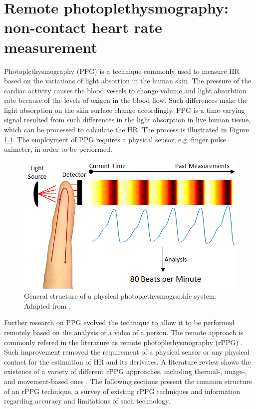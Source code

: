 \chapter{Remote photoplethysmography: non-contact heart rate measurement}
\label{ch:literature-rppg}

Photoplethysmography (PPG) is a technique commonly used to measure HR based on the variations of light absortion in the human skin. The pressure of the cardiac activity causes the blood vessels to change volume and light absorbtion rate because of the levels of oxigen in the blood flow. Such differences make the light absorption on the skin surface change accordingly. PPG is a time-varying signal resulted from such differences in the light absorption in live human tissue, which can be processed to calculate the HR. The process is illustrated in Figure \ref{fig:ppg}. The employment of PPG requires a physical sensor, e.g. finger pulse oximeter, in order to be performed.

\begin{figure}[h]
\centering
\includegraphics[width=0.7\linewidth]{Content/figures/ppg.png}
\caption{General structure of a physical photoplethysmographic system. Adapted from \textcite{chwyl2016statistical}.}
\label{fig:ppg}
\end{figure}

Further research on PPG \parencite{mcduff2015survey} evolved the technique to allow it to be performed remotely based on the analysis of a video of a person. The remote approach is commonly refered in the literature as remote photoplethysmography (rPPG)  \parencite{allen2007photoplethysmography}. Such improvement removed the requirement of a physical sensor or any physical contact for the estimation of HR and its derivates. A literature review shows the existence of a variety of different rPPG approaches, including thermal-, image-, and movement-based ones \parencite{kranjec2014non, Sereevoravitgul}. The following sections present the common structure of an rPPG technique, a survey of existing rPPG techniques and information regarding accuracy and limitations of such technology.

